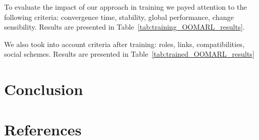 \documentclass[runningheads]{llncs}
\begin{document}
To evaluate the impact of our approach in training we payed attention to the following criteria: convergence time, stability, global performance, change sensibility. Results are presented in Table~\ref{tab:training_OOMARL_results}.



We also took into account criteria after training: roles, links, compatibilities, social schemes. Results are presented in Table~\ref{tab:trained_OOMARL_results}



\section{Conclusion}

%
%
%
% 
% 
%
\section*{References}

% 



\end{document}
